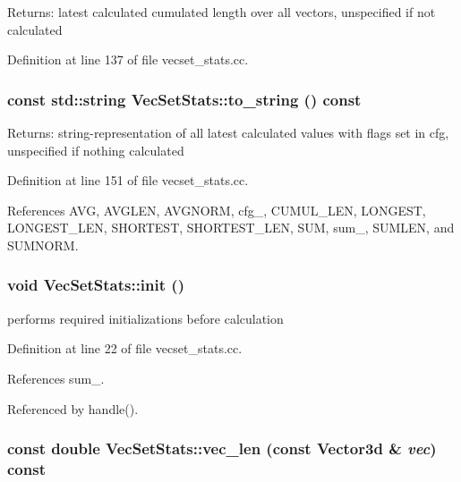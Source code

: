 \begin{Desc}
\item[Returns:]latest calculated cumulated length over all vectors, unspecified if not calculated \end{Desc}


Definition at line 137 of file vecset\_\-stats.cc.\hypertarget{class_vec_set_stats_1618681fee0ab61e61243be352a4cee5}{
\subsubsection[to\_\-string]{\setlength{\rightskip}{0pt plus 5cm}const std::string VecSetStats::to\_\-string () const}}
\label{class_vec_set_stats_1618681fee0ab61e61243be352a4cee5}


\begin{Desc}
\item[Returns:]string-representation of all latest calculated values with flags set in cfg, unspecified if nothing calculated \end{Desc}


Definition at line 151 of file vecset\_\-stats.cc.

References AVG, AVGLEN, AVGNORM, cfg\_\-, CUMUL\_\-LEN, LONGEST, LONGEST\_\-LEN, SHORTEST, SHORTEST\_\-LEN, SUM, sum\_\-, SUMLEN, and SUMNORM.\hypertarget{class_vec_set_stats_37fbc88237b5eb4d2ec81656bbf2ecc1}{
\subsubsection[init]{\setlength{\rightskip}{0pt plus 5cm}void VecSetStats::init ()}}
\label{class_vec_set_stats_37fbc88237b5eb4d2ec81656bbf2ecc1}


performs required initializations before calculation 

Definition at line 22 of file vecset\_\-stats.cc.

References sum\_\-.

Referenced by handle().\hypertarget{class_vec_set_stats_e33f29edbe292df8f90a7baed6875d4c}{
\subsubsection[vec\_\-len]{\setlength{\rightskip}{0pt plus 5cm}const double VecSetStats::vec\_\-len (const Vector3d \& {\em vec}) const}}
\label{class_vec_set_stats_e33f29edbe292df8f90a7baed6875d4c}


